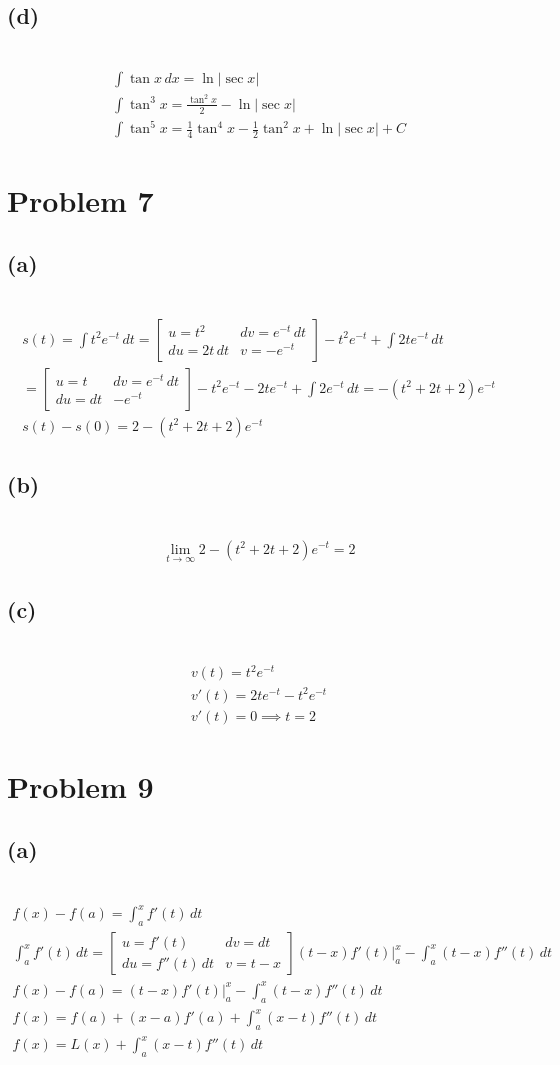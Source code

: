 \documentclass[12pt]{article}
\newcommand{\problem}[1]{\section{Problem #1}}
\newcommand{\subproblem}[1]{\subsection{(#1)} \,}
\begin{document}
\subproblem{d}
\begin{gather*}
    \int \tan x \, dx= \ln |\sec x|\\
    \int \tan^3 x = \frac{\tan^2 x}{2} -\ln |\sec x |\\
    \int \tan^5 x= \boxed{\frac{1}{4}\tan^4 x-\frac{1}{2}\tan^2 x+\ln |\sec x|+C}
\end{gather*}

\problem{7}

\subproblem{a}
\begin{gather*}
    s(t)=\int t^2e^{-t}\, dt = 
    \begin{bmatrix}
        u=t^2 & dv=e^{-t}\, dt\\
        du=2t\, dt & v= -e^{-t}
    \end{bmatrix}
    -t^2e^{-t} + \int 2te^{-t}\, dt\\
    = \begin{bmatrix}
        u=t & dv=e^{-t}\, dt\\
        du=dt & -e^{-t}
    \end{bmatrix}
    -t^2e^{-t}-2te^{-t} + \int 2e^{-t}\,dt = -(t^2+2t+2)e^{-t}\\
    s(t)-s(0)=\boxed{2-(t^2+2t+2)e^{-t}}
\end{gather*}

\subproblem{b}
\begin{gather*}
    \lim_{t\to \infty}2-(t^2+2t+2)e^{-t}=\boxed{2}
\end{gather*}

\subproblem{c}
\begin{gather*}
    v(t)=t^2e^{-t}\\
    v'(t)=2te^{-t}-t^2e^{-t}\\
    v'(t)=0 \implies \boxed{t=2}
\end{gather*}

\problem{9}

\subproblem{a}
\begin{gather*}
    f(x)-f(a)=\int_a^x f'(t)\,dt\\
    \int_a^x f'(t)\,dt =
    \begin{bmatrix}
        u=f'(t) & dv = dt\\
        du=f''(t) \,dt& v=t-x
    \end{bmatrix}
    (t-x)f'(t)\Big|_a^x - \int_a^x (t-x)f''(t)\,dt\\
    f(x)-f(a)=(t-x)f'(t)\Big|_a^x - \int_a^x (t-x)f''(t)\,dt\\
    f(x)=f(a)+(x-a)f'(a) + \int_a^x (x-t)f''(t)\, dt\\
    \boxed{f(x)=L(x)+\int_a^x (x-t)f''(t)\, dt}
\end{gather*}
\end{document}
